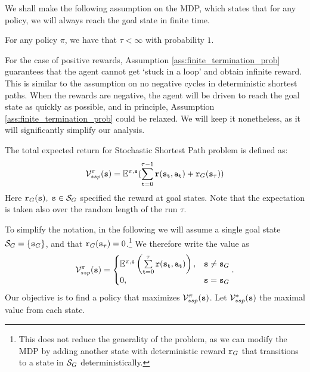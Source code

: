 We shall make the following assumption on the MDP, which states that for any policy, we will always reach the goal state in finite time.
\begin{assumption}\label{ass:finite_termination_prob}
    For any policy $\pi$, we have that $\tau < \infty$ with probability $1$.
\end{assumption}

For the case of positive rewards, Assumption \ref{ass:finite_termination_prob} guarantees that the agent cannot get `stuck in a loop' and obtain infinite reward. This is similar to the assumption on no negative cycles in deterministic shortest paths. When the rewards are negative, the agent will be driven to reach the goal state as quickly as possible, and in principle, Assumption \ref{ass:finite_termination_prob} could be relaxed. We will keep it nonetheless, as it will significantly simplify our analysis. 

The total expected return for Stochastic Shortest Path problem is defined as:
\[\mathcal{V}_{ssp}^\pi ({\tt s}) = {\mathbb{E}^{\pi ,{\tt s}}}(\sum\limits_{{\tt t} = 0}^{\tau  - 1} {{\tt r}({{\tt s}_{\tt t}},{{\tt a}_{\tt t}})}  + {{\tt r}_G}({{\tt s}_\tau }))\]
Here ${{\tt r}_G}({\tt s}),\;{\tt s} \in {\mathcal{S}_G}$ specified the
reward at goal states. Note that the expectation is taken also over the random length of the run $\tau$.

To simplify the notation, in the following we will assume a single goal state $\mathcal{S}_G = \{ {\tt s}_G \}$, and that ${{\tt r}_G}({{\tt s}_\tau }) = 0$.\footnote{This does not reduce the generality of the problem, as we can modify the MDP by adding another state with deterministic reward ${\tt r}_G$ that transitions to a state in $\mathcal{S}_G$ deterministically.}  We therefore write the value as 
\begin{equation}\label{eq:ssp_objective}
    \mathcal{V}_{ssp}^\pi ({\tt s}) = \begin{cases}
        {\ensuremath{\mathbb{E}}^{\pi,{\tt s}}}\left(\sum\limits_{{\tt t} = 0}^{\tau} {{\tt r}({{\tt s}_{\tt t}},{{\tt a}_{\tt t}})}\right), & {\tt s} \neq {\tt s}_G\\
        0, & {\tt s} = {\tt s}_G
    \end{cases}.
\end{equation}
Our objective is to find a policy that maximizes $\mathcal{V}_{ssp}^\pi ({\tt s})$. Let $\mathcal{V}_{ssp}^*({\tt s})$ the maximal value from each state.



